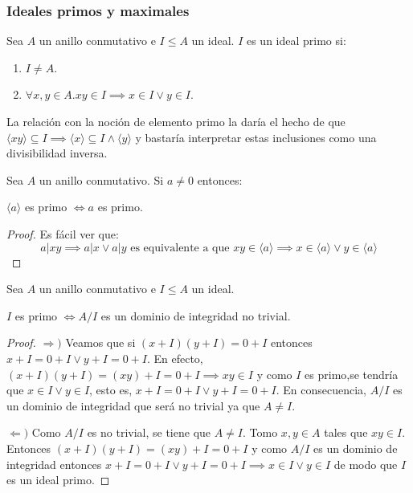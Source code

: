 \subsubsection{Ideales primos y maximales}

\begin{definition}
Sea $A$ un anillo conmutativo e $I \le A$ un ideal. $I$ es un ideal primo si:

\begin{enumerate}
\item $I \neq A$.
\item $\forall x,y \in A.xy \in I \implies x \in I \lor y \in I$. 
\end{enumerate}
\end{definition}

La relación con la noción de elemento primo la daría el hecho de que $\langle xy \rangle \subseteq I \implies \langle x \rangle \subseteq I \land \langle y \rangle$ y bastaría interpretar estas inclusiones como una divisibilidad inversa. 

\begin{corollary}
Sea $A$ un anillo conmutativo. Si $a \neq 0$ entonces:

$\langle a \rangle$ es primo $\iff a$ es primo.
\end{corollary}
\begin{proof}
Es fácil ver que: $$a|xy \implies a|x \lor a|y \text{ es equivalente a que } xy \in \langle a \rangle \implies x \in \langle a \rangle \lor y \in \langle a \rangle$$ 
\end{proof}

\begin{proposition}
Sea $A$ un anillo conmutativo e $I \le A$ un ideal.

$I$ es primo $\iff A/I$ es un dominio de integridad no trivial. 
\end{proposition}
\begin{proof}
$\Rightarrow)$ Veamos que si $(x+I)(y+I) = 0+I$ entonces $x+ I = 0 + I \lor y + I = 0 + I$. En efecto, $(x+I)(y+I) = (xy) + I = 0+I \implies xy \in I$ y como $I$ es primo,se tendría que $x \in I \lor y \in I$, esto es, $x+ I = 0 + I \lor y + I = 0 + I$. En consecuencia, $A/I$ es un dominio de integridad que será no trivial ya que $A \neq I$. 

$\Leftarrow)$ Como $A/I$ es no trivial, se tiene que $A \neq I$. Tomo $x,y \in A$ tales que $xy \in I$. Entonces $(x+I)(y+I) = (xy)+I = 0+I$ y como $A/I$ es un dominio de integridad entonces $x+I = 0+I \lor y+I = 0+I \implies x \in I \lor y \in I$ de modo que $I$ es un ideal primo. 
\end{proof}

